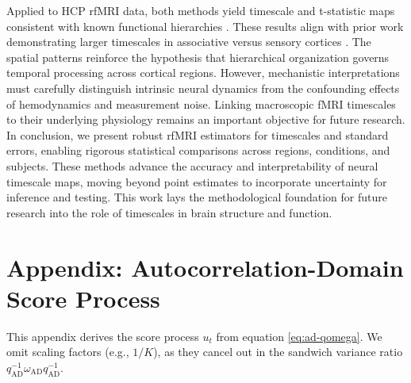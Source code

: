 \documentclass[9pt]{article}
\newcommand{\qad}{q_{\scriptscriptstyle\text{AD}}}
\newcommand{\omegaad}{\omega_{\scriptscriptstyle\text{AD}}}
\begin{document}
Applied to HCP rfMRI data, both methods yield timescale and t-statistic maps consistent with known functional hierarchies \citep{van_essen_wu-minn_2013}. These results align with prior work demonstrating larger timescales in associative versus sensory cortices \citep{raut_hierarchical_2020, shafiei_topographic_2020, lurie_cortical_2024, mitra_lag_2014, kaneoke_variance_2012, wengler_distinct_2020, shinn_functional_2023, manea_intrinsic_2022, ito_cortical_2020, muller_core_2020}. The spatial patterns reinforce the hypothesis that hierarchical organization governs temporal processing across cortical regions. However, mechanistic interpretations must carefully distinguish intrinsic neural dynamics from the confounding effects of hemodynamics and measurement noise. Linking macroscopic fMRI timescales to their underlying physiology remains an important objective for future research.\\

In conclusion, we present robust rfMRI estimators for timescales and standard errors, enabling rigorous statistical comparisons across regions, conditions, and subjects. These methods advance the accuracy and interpretability of neural timescale maps, moving beyond point estimates to incorporate uncertainty for inference and testing. This work lays the methodological foundation for future research into the role of timescales in brain structure and function.

\section*{Appendix: Autocorrelation-Domain Score Process}

This appendix derives the score process $u_t$ from equation \eqref{eq:ad-qomega}. We omit scaling factors (e.g., $1/K$), as they cancel out in the sandwich variance ratio $\qad^{-1} \omegaad \qad^{-1}$.\\
\end{document}
